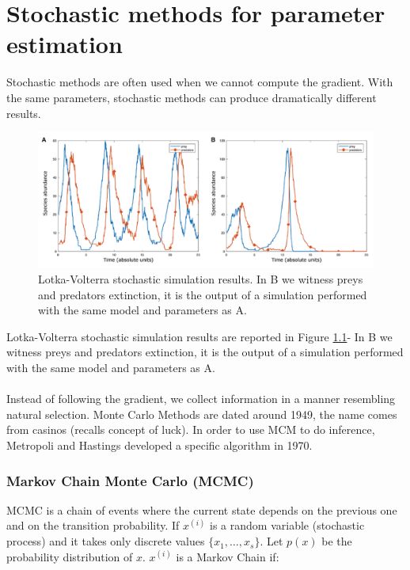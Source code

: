 \graphicspath{{chapters/11/images}}
\chapter{Stochastic methods for parameter estimation}


Stochastic methods are often used when we cannot compute the gradient.
With the same parameters, stochastic methods can produce dramatically
different results.

\begin{figure}
\centering
\includegraphics[width=\textwidth]{stoch_LV.png}
\caption{Lotka-Volterra stochastic simulation results. In B we witness
preys and predators extinction, it is the output of a simulation
performed with the same model and parameters as A.}
\label{fig:res}
\end{figure}

Lotka-Volterra stochastic simulation results are reported in Figure \ref{fig:res}- In B we witness preys and
predators extinction, it is the output of a simulation performed with
the same model and parameters as A.
\\
\\
\noindent
Instead of following the gradient, we collect information in a manner
resembling natural selection. Monte Carlo Methods are dated around 1949,
the name comes from casinos (recalls concept of luck). In order to use
MCM to do inference, Metropoli and Hastings developed a specific
algorithm in 1970.


\subsection{Markov Chain Monte Carlo (MCMC)}

MCMC is a chain of events where the current state depends on the
previous one and on the transition probability.
\noindent
If $x^{(i)}$ is a random variable (stochastic process) and it takes only
discrete values $\{x_1,\dots,x_s\}$. Let $p(x)$ be the probability
distribution of $x$. $x^{(i)}$ is a Markov Chain if:

